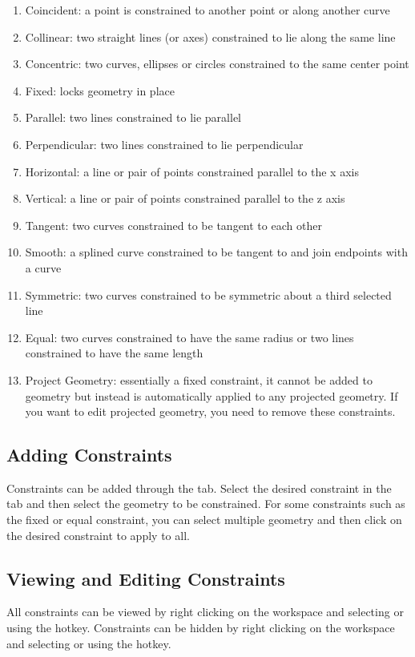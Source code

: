 \begin{enumerate}
\item Coincident: a point is constrained to another point or along another curve
\item Collinear: two straight lines (or axes) constrained to lie along the same line
\item Concentric: two curves, ellipses or circles constrained to the same center point
\item Fixed: locks geometry in place
\item Parallel: two lines constrained to lie parallel
\item Perpendicular: two lines constrained to lie perpendicular
\item Horizontal: a line or pair of points constrained parallel to the x axis
\item Vertical: a line or pair of points constrained parallel to the z axis
\item Tangent: two curves constrained to be tangent to each other
\item Smooth: a splined curve constrained to be tangent to and join endpoints with a curve
\item Symmetric: two curves constrained to be symmetric about a third selected line
\item Equal: two curves constrained to have the same radius or two lines constrained to have the same length
\item Project Geometry: essentially a fixed constraint, it cannot be added to geometry but instead is automatically applied to any projected geometry. If you want to edit projected geometry, you need to remove these constraints.
\end{enumerate}

\cbend

\subsection{Adding Constraints}
\cbstart
Constraints can be added through the  tab. Select the desired constraint in the tab and then select the geometry to be constrained. For some constraints such as the fixed or equal constraint, you can select multiple geometry and then click on the desired constraint to apply to all.
\cbend
\subsection{Viewing and Editing Constraints}
\cbstart
All constraints can be viewed by right clicking on the workspace and selecting  or using the  hotkey. Constraints can be hidden by right clicking on the workspace and selecting  or using the  hotkey.

